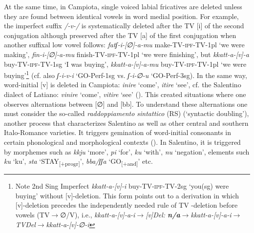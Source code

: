 \documentclass[output=paper]{langscibook}
\begin{document}
At the same time, in Campiota, single voiced labial fricatives are deleted unless they are found between identical vowels in word medial position.  For example, the imperfect suffix \textit{/-v-/} is systematically deleted after the TV [i] of the second conjugation although preserved after the TV [a] of the first conjugation when  another suffixal low vowel follows: \textit{fatʃ-i-[∅]-a-mu} make-TV-\textsc{ipf}-TV-1pl ‘we were making’, \textit{fin-i-[∅]-a-mu} finish-TV-\textsc{ipf}-TV-1pl ‘we were finishing’, but \textit{kkatt-a-[v]-a}  buy-TV-\textsc{ipf}-TV-1sg ‘I was buying’, \textit{kkatt-a-[v]-a-mu} buy-TV-\textsc{ipf}-TV-1pl ‘we were buying’\footnote{Note 2nd Sing Imperfect \textit{kkatt-a-[v]-i} buy-TV-\textsc{ipf}-TV-2sg `you(sg) were buying' without [v]-deletion.  This form points out to a derivation in which [v]-deletion precedes the independently needed rule of TV -deletion before vowels (TV$\rightarrow$∅\slash\underline{\phantom{xxx}}V), i.e., \textit{kkatt-a-[v]-a-i$\rightarrow$[v]Del: \textbf{n/a}$\rightarrow$kkatt-a-[v]-a-i$\rightarrow$TVDel$\rightarrow$kkatt-a-[v]-∅-i}}  (cf. also \textit{ʃ-i-v-i} ‘GO-Perf-1sg vs. \textit{ʃ-i-∅-u} ‘GO-Perf-3sg).  In the same way, word-initial [v] is deleted in Campiota: \textit{inire}  ‘come’, \textit{itire} ‘see’, cf. the Salentino dialect of Latiano: \textit{vinire} ‘come’, \textit{vitire} ‘see’ (\citealt{urgese2003a}).   This created situations where one observes alternations between [∅] and [bb]. To understand these alternations one must consider the so-called \textit{raddoppiamento sintattico} (RS) (‘syntactic doubling’), another process that characterizes Salentino as well as other central and southern Italo-Romance varieties.  It triggers gemination of word-initial consonants in certain phonological and morphological contexts (\citealt{chierchia1986a, loporcaro1997}).  In Salentino, it is triggered by morphemes such as \textit{kkju} ‘more’, \textit{pi} ‘for’, \textit{ku} ‘with’, \textit{nu} ‘negation’, elements such \textit{ku} ‘ku’, \textit{sta} ‘STAY\textsubscript{[+progr]}’, \textit{bba/ʃʃa} ‘GO\textsubscript{[+and]}’ etc.
\end{document}
